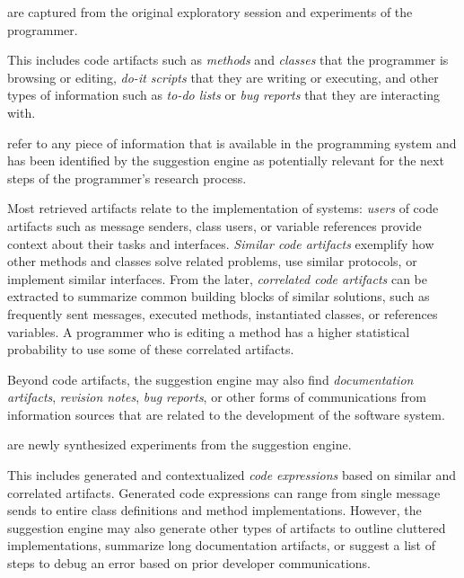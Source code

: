 \begin{description}[noextralabelsep]
	\item[Input artifacts] are captured from the original exploratory session and experiments of the programmer.

	This includes code artifacts such as \emph{methods} and \emph{classes} that the programmer is browsing or editing, \emph{do-it scripts} that they are writing or executing, and other types of information such as \emph{to-do lists} or \emph{bug reports} that they are interacting with.

	\item[Retrieved artifacts] refer to any piece of information that is available in the programming system and has been identified by the suggestion engine as potentially relevant for the next steps of the programmer's research process.

	Most retrieved artifacts relate to the implementation of systems: \emph{users} of code artifacts such as message senders, class users, or variable references provide context about their tasks and interfaces.
	\emph{Similar code artifacts} exemplify how other methods and classes solve related problems, use similar protocols, or implement similar interfaces.
	From the later, \emph{correlated code artifacts} can be extracted to summarize common building blocks of similar solutions, such as frequently sent messages, executed methods, instantiated classes, or references variables.
	A programmer who is editing a method has a higher statistical probability to use some of these correlated artifacts.

	Beyond code artifacts, the suggestion engine may also find \emph{documentation artifacts}, \emph{revision notes}, \emph{bug reports}, or other forms of communications from information sources that are related to the development of the software system.

	\item[Generated artifacts] are newly synthesized experiments from the suggestion engine.

	This includes generated and contextualized \emph{code expressions} based on similar and correlated artifacts.
	Generated code expressions can range from single message sends to entire class definitions and method implementations.
	However, the suggestion engine may also generate other types of artifacts to outline cluttered implementations, summarize long documentation artifacts, or suggest a list of steps to debug an error based on prior developer communications.
\end{description}

